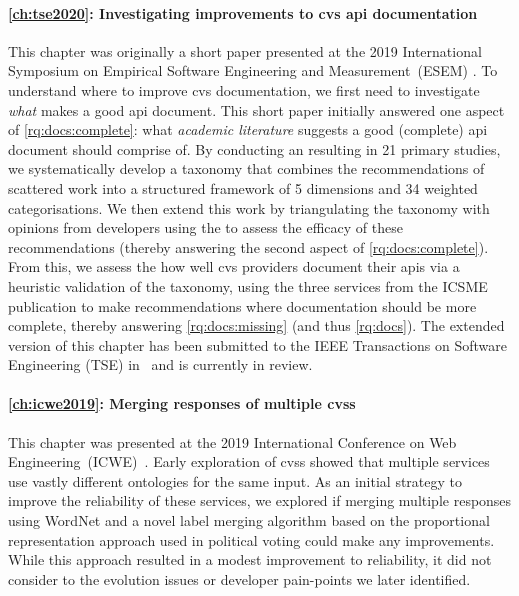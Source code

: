 \paragraph{\cref{ch:tse2020}: Investigating improvements to \gls{cvs} \gls{api} documentation} This chapter was originally a short paper presented at the 2019 International Symposium on Empirical Software Engineering and Measurement~(ESEM) \citep{Cummaudo:2020icse}. To understand where to improve \gls{cvs} documentation, we first need to investigate \textit{what} makes a good \gls{api} document. This short paper initially answered one aspect of \ref{rq:docs:complete}: what \textit{academic literature} suggests a good (complete) \gls{api} document should comprise of. By conducting an  resulting in 21 primary studies, we systematically develop a taxonomy that combines the recommendations of scattered work into a structured framework of 5 dimensions and 34 weighted categorisations. We then extend this work by triangulating the taxonomy with opinions from developers using the  to assess the efficacy of these recommendations (thereby answering the second aspect of \ref{rq:docs:complete}). From this, we assess the how well \gls{cvs} providers document their \glspl{api} via a heuristic validation of the taxonomy, using the three services from the ICSME publication to make recommendations where documentation should be more complete, thereby answering \ref{rq:docs:missing} (and thus \ref{rq:docs}). The extended version of this chapter has been submitted to the IEEE Transactions on Software Engineering (TSE) in~\citep{Cummaudo:2020tse} and is currently in review.

\paragraph{\cref{ch:icwe2019}: Merging responses of multiple \glspl{cvs}} This chapter was presented at the 2019 International Conference on Web Engineering~(ICWE)~\citep{Ohtake:2019vi}. Early exploration of \glspl{cvs} showed that multiple services use vastly different ontologies for the same input. As an initial strategy to improve the reliability of these services, we explored if merging multiple responses using WordNet \citep{WordNetMiller1995} and a novel label merging algorithm based on the proportional representation approach used in political voting could make any improvements. While this approach resulted in a modest improvement to reliability, it did not consider to the evolution issues or developer pain-points we later identified.

